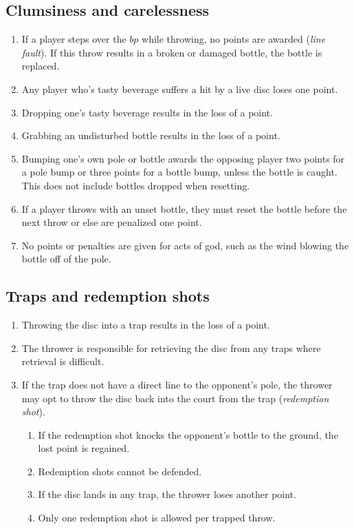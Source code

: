 \documentclass[11pt,letterpaper,twocolumn,english,DIV=calc]{scrartcl}
\begin{document}
\subsection{\label{subsec:clumsiness-and-carelessness}Clumsiness and carelessness}
\begin{enumerate}[leftmargin=2.8em, label=\thesubsection.\arabic*]
	\item If a player steps over the $bp$ while throwing, no points are awarded (\emph{line fault}). 
	If this throw results in a broken or damaged bottle, the bottle is replaced.
	\item Any player who's tasty beverage suffers a hit by a live disc loses one point.
	\item Dropping one's tasty beverage results in the loss of a point.
	\item Grabbing an undisturbed bottle results in the loss of a point.
	\item Bumping one's own pole or bottle awards the opposing player two points for a pole bump or three points for a bottle bump, unless the bottle is caught. 
	This does not include bottles dropped when resetting.
	\item If a player throws with an unset bottle, they must reset the bottle before the next throw or else are penalized one point.
	\item No points or penalties are given for acts of god, such as the wind blowing the bottle off of the pole.
\end{enumerate}

\subsection{\label{subsec:traps}Traps and redemption shots}
\begin{enumerate}[leftmargin=2.8em, label=\thesubsection.\arabic*]
	\item Throwing the disc into a trap results in the loss of a point.
	\item The thrower is responsible for retrieving the disc from any traps where retrieval is difficult.
	\item If the trap does not have a direct line to the opponent's pole, the thrower may opt to throw the disc back into the court from the trap (\emph{redemption shot}).

	\begin{enumerate}
		\item If the redemption shot knocks the opponent's bottle to the ground, the lost point is regained.
		\item Redemption shots cannot be defended.
		\item If the disc lands in any trap, the thrower loses another point.
		\item Only one redemption shot is allowed per trapped throw.
	\end{enumerate}
\end{enumerate}
\end{document}
